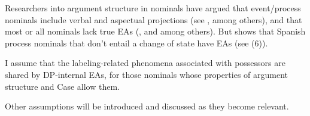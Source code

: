 \documentclass[output=paper
,modfonts
,nonflat]{langsci/langscibook}
\begin{document}
\begin{figure}[!h]
\begin{exe}
\end{exe}
\end{figure}
\newpage \noindent Researchers into argument structure in nominals have argued that event/process nominals include verbal and aspectual projections (see \citealt{Hazout1995}, \citealt{Borer1993} among others), and that most or all nominals lack true EAs (\citealt{Alexiadou2001}, and \citealt{Picallo1991} among others). But \citet{Lopez2018} shows that Spanish process nominals that don’t entail a change of state have EAs (see (6)).

I assume that the labeling-related phenomena associated with possessors are shared by DP-internal EAs, for those nominals whose properties of argument structure and Case allow them. 

Other assumptions will be introduced and discussed as they become relevant.
\end{document}
